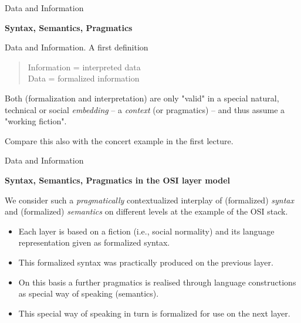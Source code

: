\documentclass{beamer}
\newcommand{\ueberschrift}[1]{\begin{center}\bf #1\end{center}}
\begin{document}
\begin{frame}{Data and Information}

  \ueberschrift{Syntax, Semantics, Pragmatics}
  
  \begin{block}{Data and Information. A first definition}
    \begin{quote}
      Information = interpreted data\\
      Data = formalized information
    \end{quote}
  \end{block}

Both (formalization and interpretation) are only "valid" in a special natural,
technical or social \emph{embedding} -- a \emph{context} (or pragmatics) --
and thus assume a "working fiction".

Compare this also with the concert example in the first lecture.
\vfill
\end{frame}
\begin{frame}{Data and Information}

  \ueberschrift{Syntax, Semantics, Pragmatics in the OSI layer model}

We consider such a \emph{pragmatically} contextualized interplay of
(formalized) \emph{syntax} and (formalized) \emph{semantics} on different
levels at the example of the OSI stack.

\begin{itemize}
\item Each layer is based on a fiction (i.e., social normality) and its
  language representation given as formalized syntax. 
\item This formalized syntax was practically produced on the previous layer.
\item On this basis a further pragmatics is realised through language
  constructions as special way of speaking (semantics).  
\item This special way of speaking in turn is formalized for use on the next
  layer.
\end{itemize}
\end{frame}
\end{document}
